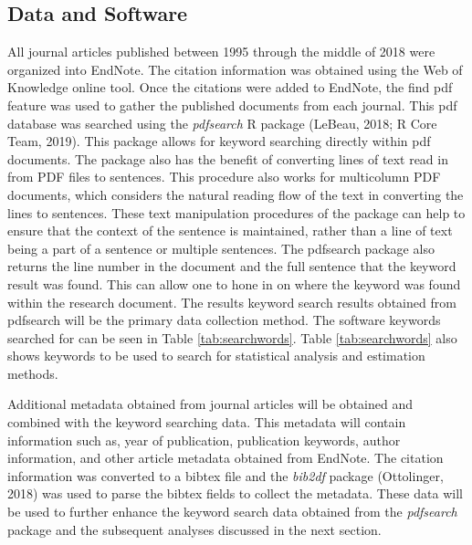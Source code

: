 \documentclass[
  english,
  ,man]{apa7}
\begin{document}
\hypertarget{data-and-software}{%
\subsection{Data and Software}\label{data-and-software}}

All journal articles published between 1995 through the middle of 2018 were organized into EndNote. The citation information was obtained using the Web of Knowledge online tool. Once the citations were added to EndNote, the find pdf feature was used to gather the published documents from each journal. This pdf database was searched using the \emph{pdfsearch} R package (LeBeau, 2018; R Core Team, 2019). This package allows for keyword searching directly within pdf documents. The package also has the benefit of converting lines of text read in from PDF files to sentences. This procedure also works for multicolumn PDF documents, which considers the natural reading flow of the text in converting the lines to sentences. These text manipulation procedures of the package can help to ensure that the context of the sentence is maintained, rather than a line of text being a part of a sentence or multiple sentences. The pdfsearch package also returns the line number in the document and the full sentence that the keyword result was found. This can allow one to hone in on where the keyword was found within the research document. The results keyword search results obtained from pdfsearch will be the primary data collection method. The software keywords searched for can be seen in Table \ref{tab:searchwords}. Table \ref{tab:searchwords} also shows keywords to be used to search for statistical analysis and estimation methods.

Additional metadata obtained from journal articles will be obtained and combined with the keyword searching data. This metadata will contain information such as, year of publication, publication keywords, author information, and other article metadata obtained from EndNote. The citation information was converted to a bibtex file and the \emph{bib2df} package (Ottolinger, 2018) was used to parse the bibtex fields to collect the metadata. These data will be used to further enhance the keyword search data obtained from the \emph{pdfsearch} package and the subsequent analyses discussed in the next section.
\end{document}
